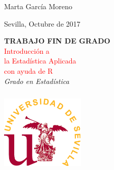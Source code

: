 \begin{titlepage} %

	\raggedleft %
	
	\vspace*{\baselineskip} %
	
	
	{\LARGE Marta García Moreno} %

	\bigskip %

	{\Large Sevilla, Octubre de 2017} %
	
	\vspace*{0.167\textheight} %
	
	
	\textbf{\LARGE TRABAJO FIN DE GRADO}\\[\baselineskip] %
	
	{\textcolor{red}{\Huge Introducción a \\[0.6\baselineskip]
la Estadística Aplicada\\[0.6\baselineskip] 
con ayuda de R}}\\[\baselineskip] %
	
	{\LARGE \textit{Grado en Estadística}} %
	
	\vfill %
	
	
	\includegraphics[width=4cm,height=4cm]{logo} %
	
	\vspace*{3\baselineskip} %

\vfill %

\cleardoublepage
\thispagestyle{empty}
\end{titlepage}


\raggedbottom


%

